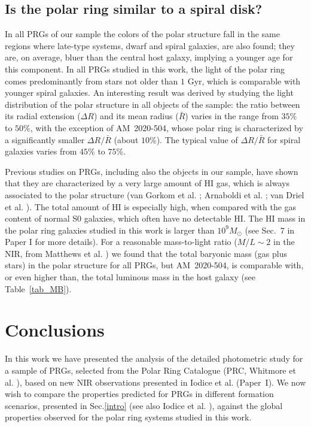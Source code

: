 \documentclass{aa}
\begin{document}
\subsection{Is the polar ring similar to a spiral disk?}

In all PRGs of our sample the colors of the polar structure fall in the same 
regions where late-type systems, dwarf and spiral galaxies, are also
found; they are, on average, bluer than the central host galaxy, 
implying a younger age for this component. 
In all PRGs studied in this work, the light of the polar
ring comes predominantly from stars not older than $1$ Gyr, which is
comparable with younger spiral galaxies.
An interesting result was derived by studying the light distribution of 
the polar structure in all objects of the sample: the ratio between its
radial extension ($\Delta R$) and its mean radius ($\bar R$) varies in the
range from  $35\%$ to $50\%$, with the exception of
AM~2020-504, whose polar ring is characterized by a significantly smaller
$\Delta R / \bar R$  (about $10\%$). The typical value of $\Delta R / \bar R$ 
for spiral galaxies varies from $45\%$ to $75\%$.
 
Previous studies on PRGs, including also the objects in our sample, have
shown that they are characterized by a very large amount of HI gas,
which is always associated to the polar structure (van Gorkom et
al. \cite{vgorkom87}; Arnaboldi et al. \cite{magda97}; van Driel et
al. \cite{vdriel2000}). The total amount of HI is especially high, when 
compared with the gas content of normal S0 galaxies, which often have no
detectable HI.
The HI mass in the polar ring galaxies studied in this work is larger than 
$10^9 M_\odot$ (see Sec.~7 in Paper I for more details). 
For a reasonable mass-to-light ratio ($M/L \sim 2$ in the
NIR, from Matthews et al. \cite{Matthews98}) we found that the total
baryonic mass (gas plus stars)  in the polar structure for all PRGs, but
AM~2020-504, is comparable with, or even 
higher than, the total luminous mass in the host galaxy (see
Table~\ref{tab_MB}).

\section{Conclusions}\label{conclu}
In this work we have presented the analysis of the detailed photometric study 
for a sample of PRGs, selected from the Polar Ring Catalogue (PRC,
Whitmore et al. \cite{PRC}), based on new NIR observations presented in
Iodice et al. \cite{paperI} (Paper~I).
We now wish to compare the properties predicted for PRGs in different  
formation scenarios, presented in  Sec.\ref{intro} (see also Iodice et
al. \cite{4650aI}), against the global properties observed for the polar
ring systems studied in this work.  
\end{document}
